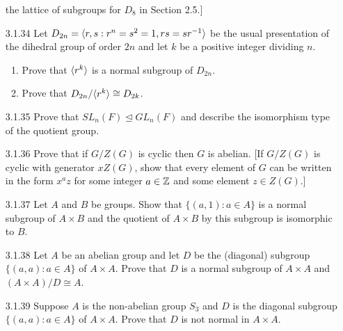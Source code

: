 \begin{enumerate}
                  the lattice of subgroups for $D_8$ in Section 2.5.]
   \item[3.1.34]  Let $D_{2n} = \langle r, s : r^n = s^2 = 1, rs = sr^{-1} \rangle$ be the
                  usual presentation of the dihedral group of order $2n$ and let
                  $k$ be a positive integer dividing $n$.
                  \begin{enumerate}
                     \item Prove that $\langle r^k \rangle$ is a normal subgroup of
                           $D_{2n}$.
                     \item Prove that $D_{2n}/\langle r^k \rangle \cong D_{2k}$.
                  \end{enumerate}
   \item[3.1.35]  Prove that $SL_n(F) \trianglelefteq GL_n(F)$ and describe the
                  isomorphism type of the quotient group.
   \item[3.1.36]  Prove that if $G/Z(G)$ is cyclic then $G$ is abelian. [If
                  $G/Z(G)$ is cyclic with generator $xZ(G)$, show that every
                  element of $G$ can be written in the form $x^az$ for some
                  integer $a \in \mathbb{Z}$ and some element $z \in Z(G)$.]
   \item[3.1.37]  Let $A$ and $B$ be groups. Show that $\{(a, 1) : a \in A\}$ is
                  a normal subgroup of $A \times B$ and the quotient of
                  $A \times B$ by this subgroup is isomorphic to $B$.
   \item[3.1.38]  Let $A$ be an abelian group and let $D$ be the (diagonal)
                  subgroup $\{(a, a) : a \in A\}$ of $A \times A$. Prove that
                  $D$ is a normal subgroup of $A \times A$ and
                  $(A \times A)/D \cong A$.
   \item[3.1.39]  Suppose $A$ is the non-abelian group $S_3$ and $D$ is the
                  diagonal subgroup $\{(a, a) : a \in A\}$ of $A \times A$.
                  Prove that $D$ is not normal in $A \times A$.

\end{enumerate}
